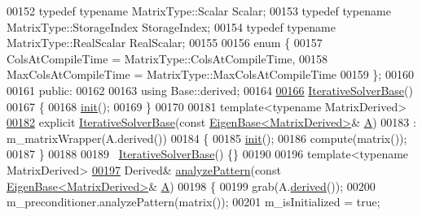 \begin{DoxyCode}
00152   \textcolor{keyword}{typedef} \textcolor{keyword}{typename} MatrixType::Scalar Scalar;
00153   \textcolor{keyword}{typedef} \textcolor{keyword}{typename} MatrixType::StorageIndex StorageIndex;
00154   \textcolor{keyword}{typedef} \textcolor{keyword}{typename} MatrixType::RealScalar RealScalar;
00155 
00156   \textcolor{keyword}{enum} \{
00157     ColsAtCompileTime = MatrixType::ColsAtCompileTime,
00158     MaxColsAtCompileTime = MatrixType::MaxColsAtCompileTime
00159   \};
00160 
00161 \textcolor{keyword}{public}:
00162 
00163   \textcolor{keyword}{using} Base::derived;
00164 
\hyperlink{group___iterative_linear_solvers___module_a0922f2be45082690d7734aa6732fc493}{00166}   \hyperlink{group___iterative_linear_solvers___module_a0922f2be45082690d7734aa6732fc493}{IterativeSolverBase}()
00167   \{
00168     \hyperlink{structinit}{init}();
00169   \}
00170 
00181   \textcolor{keyword}{template}<\textcolor{keyword}{typename} MatrixDerived>
\hyperlink{group___iterative_linear_solvers___module_a3c68fe3cd929ea1ff8a0d4cbcd65ebad}{00182}   \textcolor{keyword}{explicit} \hyperlink{group___iterative_linear_solvers___module_a3c68fe3cd929ea1ff8a0d4cbcd65ebad}{IterativeSolverBase}(\textcolor{keyword}{const} \hyperlink{group___core___module_struct_eigen_1_1_eigen_base}{EigenBase<MatrixDerived>}& 
      \hyperlink{group___core___module_class_eigen_1_1_matrix}{A})
00183     : m\_matrixWrapper(A.derived())
00184   \{
00185     \hyperlink{structinit}{init}();
00186     compute(matrix());
00187   \}
00188 
00189   ~\hyperlink{group___iterative_linear_solvers___module_class_eigen_1_1_iterative_solver_base}{IterativeSolverBase}() \{\}
00190   
00196   \textcolor{keyword}{template}<\textcolor{keyword}{typename} MatrixDerived>
\hyperlink{group___iterative_linear_solvers___module_a3f684fb41019ca04d97ddc08a0d8be2e}{00197}   Derived& \hyperlink{group___iterative_linear_solvers___module_a3f684fb41019ca04d97ddc08a0d8be2e}{analyzePattern}(\textcolor{keyword}{const} \hyperlink{group___core___module_struct_eigen_1_1_eigen_base}{EigenBase<MatrixDerived>}& 
      \hyperlink{group___core___module_class_eigen_1_1_matrix}{A})
00198   \{
00199     grab(A.\hyperlink{group___core___module_a324b16961a11d2ecfd2d1b7dd7946545}{derived}());
00200     m\_preconditioner.analyzePattern(matrix());
00201     m\_isInitialized = \textcolor{keyword}{true};

\end{DoxyCode}

